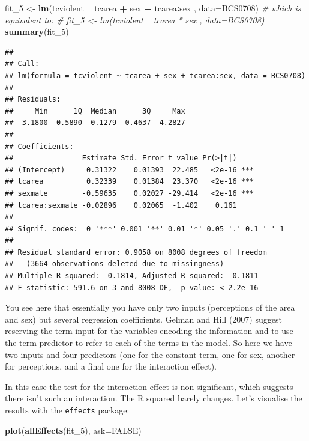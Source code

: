 \documentclass[]{book}
\newenvironment{Shaded}{\begin{snugshade}}{\end{snugshade}}
\newcommand{\CommentTok}[1]{\textcolor[rgb]{0.56,0.35,0.01}{\textit{#1}}}
\newcommand{\DataTypeTok}[1]{\textcolor[rgb]{0.13,0.29,0.53}{#1}}
\newcommand{\DecValTok}[1]{\textcolor[rgb]{0.00,0.00,0.81}{#1}}
\newcommand{\KeywordTok}[1]{\textcolor[rgb]{0.13,0.29,0.53}{\textbf{#1}}}
\newcommand{\NormalTok}[1]{#1}
\newcommand{\OperatorTok}[1]{\textcolor[rgb]{0.81,0.36,0.00}{\textbf{#1}}}
\newcommand{\OtherTok}[1]{\textcolor[rgb]{0.56,0.35,0.01}{#1}}
\newcommand{\StringTok}[1]{\textcolor[rgb]{0.31,0.60,0.02}{#1}}
\theoremstyle{definition}
\theoremstyle{definition}
\theoremstyle{definition}
\theoremstyle{remark}
\begin{document}
\begin{Shaded}
\begin{Highlighting}[]
\NormalTok{fit_}\DecValTok{5}\NormalTok{ <-}\StringTok{ }\KeywordTok{lm}\NormalTok{(tcviolent }\OperatorTok{~}\StringTok{ }\NormalTok{tcarea }\OperatorTok{+}\StringTok{ }\NormalTok{sex }\OperatorTok{+}\StringTok{ }\NormalTok{tcarea}\OperatorTok{:}\NormalTok{sex , }\DataTypeTok{data=}\NormalTok{BCS0708)}
\CommentTok{# which is equivalent to: }
\CommentTok{# fit_5 <- lm(tcviolent ~ tcarea * sex , data=BCS0708)}
\KeywordTok{summary}\NormalTok{(fit_}\DecValTok{5}\NormalTok{)}
\end{Highlighting}
\end{Shaded}

\begin{verbatim}
## 
## Call:
## lm(formula = tcviolent ~ tcarea + sex + tcarea:sex, data = BCS0708)
## 
## Residuals:
##     Min      1Q  Median      3Q     Max 
## -3.1800 -0.5890 -0.1279  0.4637  4.2827 
## 
## Coefficients:
##                Estimate Std. Error t value Pr(>|t|)    
## (Intercept)     0.31322    0.01393  22.485   <2e-16 ***
## tcarea          0.32339    0.01384  23.370   <2e-16 ***
## sexmale        -0.59635    0.02027 -29.414   <2e-16 ***
## tcarea:sexmale -0.02896    0.02065  -1.402    0.161    
## ---
## Signif. codes:  0 '***' 0.001 '**' 0.01 '*' 0.05 '.' 0.1 ' ' 1
## 
## Residual standard error: 0.9058 on 8008 degrees of freedom
##   (3664 observations deleted due to missingness)
## Multiple R-squared:  0.1814, Adjusted R-squared:  0.1811 
## F-statistic: 591.6 on 3 and 8008 DF,  p-value: < 2.2e-16
\end{verbatim}

You see here that essentially you have only two inputs (perceptions of
the area and sex) but several regression coefficients. Gelman and Hill
(2007) suggest reserving the term input for the variables encoding the
information and to use the term predictor to refer to each of the terms
in the model. So here we have two inputs and four predictors (one for
the constant term, one for sex, another for perceptions, and a final one
for the interaction effect).

In this case the test for the interaction effect is non-significant,
which suggests there isn't such an interaction. The R squared barely
changes. Let's visualise the results with the \texttt{effects} package:

\begin{Shaded}
\begin{Highlighting}[]
\KeywordTok{plot}\NormalTok{(}\KeywordTok{allEffects}\NormalTok{(fit_}\DecValTok{5}\NormalTok{), }\DataTypeTok{ask=}\OtherTok{FALSE}\NormalTok{)}
\end{Highlighting}
\end{Shaded}
\end{document}
